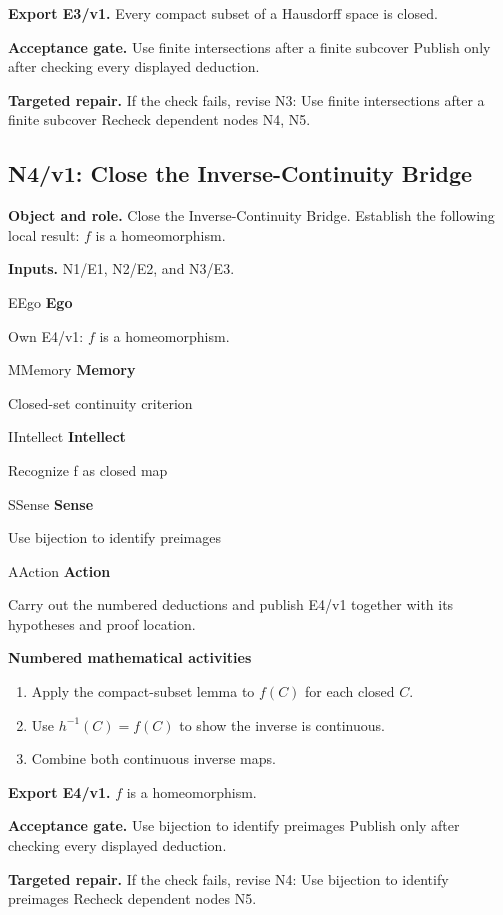 \documentclass[preprint,12pt,aps,pra,showkeys,amsmath,amssymb,superscriptaddress,floatfix]{revtex4-2}
\theoremstyle{definition}
\theoremstyle{remark}
\newcommand{\mmfaculty}[3]{%
 \begin{mmfacultybox}{#1}{#2}
 {\sffamily\bfseries\color{MMBlue}#2}\par\smallskip #3
 \end{mmfacultybox}}
\newcommand{\field}[2]{\par\smallskip\noindent\textbf{#1.} #2\par}
\begin{document}
\field{Export E3/v1}{Every compact subset of a Hausdorff space is closed.}

\field{Acceptance gate}{Use finite intersections after a finite subcover Publish only after
checking every displayed deduction.}

\field{Targeted repair}{If the check fails, revise N3: Use finite intersections after a finite
subcover Recheck dependent nodes N4, N5.}

\clearpage

\subsection{N4/v1: Close the Inverse-Continuity Bridge}

\field{Object and role}{Close the Inverse-Continuity Bridge. Establish the following local
result: \(f\) is a homeomorphism.}

\field{Inputs}{N1/E1, N2/E2, and N3/E3.}

\mmfaculty{E}{Ego}{Own E4/v1: \(f\) is a homeomorphism.}

\mmfaculty{M}{Memory}{Closed-set continuity criterion}

\mmfaculty{I}{Intellect}{Recognize f as closed map}

\mmfaculty{S}{Sense}{Use bijection to identify preimages}

\mmfaculty{A}{Action}{Carry out the numbered deductions and publish E4/v1 together with its
hypotheses and proof location.}

\smallskip\noindent\textbf{Numbered mathematical activities}

\begin{enumerate}[label=N4.\arabic*,leftmargin=3.4em]

\item Apply the compact-subset lemma to \(f(C)\) for each closed \(C\).

\item Use \(h^{-1}(C)=f(C)\) to show the inverse is continuous.

\item Combine both continuous inverse maps.

\end{enumerate}

\field{Export E4/v1}{\(f\) is a homeomorphism.}

\field{Acceptance gate}{Use bijection to identify preimages Publish only after checking every
displayed deduction.}

\field{Targeted repair}{If the check fails, revise N4: Use bijection to identify preimages
Recheck dependent nodes N5.}
\end{document}
